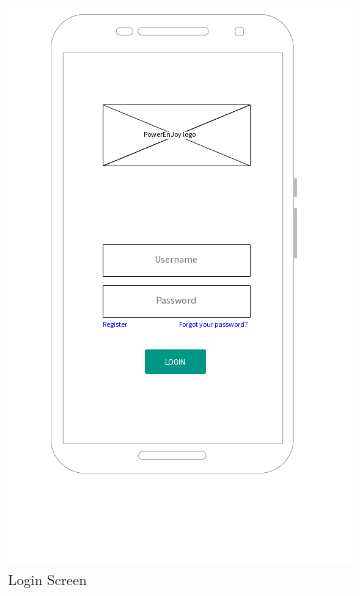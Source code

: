 \documentclass[12pt]{article}
\begin{document}
\begin{figure}[h!]
    \centering
    \begin{subfigure}[b]{0.45\textwidth}
        \includegraphics[width=\textwidth]{../UI/LoginScreen}
        \caption{Login Screen}
    \end{subfigure}
    ~
    \begin{subfigure}[b]{0.45\textwidth}

\end{subfigure}
\end{figure}
\end{document}
